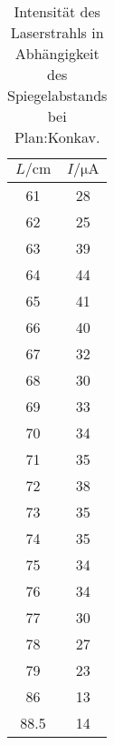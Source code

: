 \begin{table}
    \centering
    \caption{Intensität des Laserstrahls in Abhängigkeit des Spiegelabstands bei Plan:Konkav.}
    \label{tab:kon_flach_data}
    \begin{tabular}{c c}
        \toprule
        $L/\si{\centi\meter}$ & $I/\si{\micro\ampere} $ \\
        \midrule
        61  &    28\\
        62  &    25\\
        63  &    39\\
        64  &    44\\
        65  &    41\\
        66  &    40\\
        67  &    32\\
        68  &    30\\
        69  &    33\\
        70  &    34\\
        71  &    35\\
        72  &    38\\
        73  &    35\\
        74  &    35\\
        75  &    34\\
        76  &    34\\
        77  &    30\\
        78  &    27\\
        79  &    23\\
        86  &    13\\
        88.5&    14\\
        \bottomrule
    \end{tabular}
\end{table}

